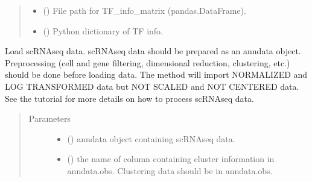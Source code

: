 \documentclass[letterpaper,10pt,english]{sphinxmanual}
\begin{document}
\begin{fulllineitems}
\begin{fulllineitems}
\begin{quote}
\begin{description}
\begin{itemize}
\item {} 
 () \textendash{} File path for TF\_info\_matrix (pandas.DataFrame).

\item {} 
 () \textendash{} Python dictionary of TF info.

\end{itemize}

\end{description}\end{quote}

\end{fulllineitems}


\begin{fulllineitems}
\label{\detokenize{modules/celloracle:celloracle.Oracle.import_anndata_as_normalized_count}}
Load scRNA\sphinxhyphen{}seq data. scRNA\sphinxhyphen{}seq data should be prepared as an anndata object.
Preprocessing (cell and gene filtering, dimensional reduction, clustering, etc.) should be done before loading data.
The method will import NORMALIZED and LOG TRANSFORMED data but NOT SCALED and NOT CENTERED data.
See the tutorial for more details on how to process scRNA\sphinxhyphen{}seq data.
\begin{quote}\begin{description}
\item[{Parameters}] \leavevmode\begin{itemize}
\item {} 
 () \textendash{} anndata object containing scRNA\sphinxhyphen{}seq data.

\item {} 
 () \textendash{} the name of column containing cluster information in anndata.obs.
Clustering data should be in anndata.obs.


\end{itemize}
\end{description}
\end{quote}
\end{fulllineitems}
\end{fulllineitems}
\end{document}
